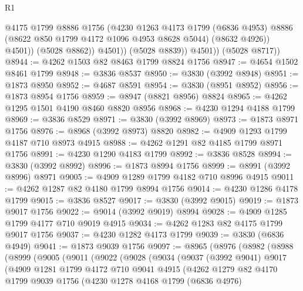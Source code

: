 \begin{lexlean}{R1}
\begin{coremodule}
                      @4175
                      @1799
                      @8886
                      @1756
                      (@4230
                        @1263
                        @4173
                        @1799
                        (@6836 @4953)
                        @8886
                        (@8622 @850 @1799 @4172 @1096 @4953 @8628 @5044)
                        (@8632 @4926))
                      @4501))
                  (@5028 @8862))
                @4501))
            (@5028 @8839))
          @4501))
      (@5028 @8717))
@8944 := @4262 @1503 @82 @8463 @1799 @8824 @1756
@8947 := @4654 @1502 @8461 @1799
@8948 := @3836 @8537
@8950 := @3830 (@3992 @8948)
@8951 := @1873 @8950
@8952 := @4687 @8591
@8954 := @3830 (@8951 @8952)
@8956 := @1873 @8954 @1756
@8959 := @8947 (@8821 @8956) @8824
@8965 := @4262 @1295 @1501 @4190 @8460 @8820 @8956
@8968 := @4230 @1294 @4188 @1799
@8969 := @3836 @8529
@8971 := @3830 (@3992 @8969)
@8973 := @1873 @8971 @1756
@8976 := @8968 (@3992 @8973) @8820
@8982 := @4909 @1293 @1799 @4187 @710 @8973 @4915
@8988 := @4262 @1291 @82 @4185 @1799 @8971 @1756
@8991 := @4230 @1290 @4183 @1799
@8992 := @3836 @8528
@8994 := @3830 (@3992 @8992)
@8996 := @1873 @8994 @1756
@8999 := @8991 (@3992 @8996) @8971
@9005 := @4909 @1289 @1799 @4182 @710 @8996 @4915
@9011 := @4262 @1287 @82 @4180 @1799 @8994 @1756
@9014 := @4230 @1286 @4178 @1799
@9015 := @3836 @8527
@9017 := @3830 (@3992 @9015)
@9019 := @1873 @9017 @1756
@9022 := @9014 (@3992 @9019) @8994
@9028 := @4909 @1285 @1799 @4177 @710 @9019 @4915
@9034 := @4262 @1283 @82 @4175 @1799 @9017 @1756
@9037 := @4230 @1282 @4173 @1799
@9039 := @3830 (@6836 @4949)
@9041 := @1873 @9039 @1756
@9097 := @8965
    (@8976
      (@8982
        (@8988
          (@8999
            (@9005
              (@9011
                (@9022
                  (@9028
                    (@9034
                      (@9037
                        (@3992 @9041)
                        @9017
                        (@4909
                          @1281
                          @1799
                          @4172
                          @710
                          @9041
                          @4915
                          (@4262
                            @1279
                            @82
                            @4170
                            @1799
                            @9039
                            @1756
                            (@4230
                              @1278
                              @4168
                              @1799
                              (@6836 @4976)

\end{coremodule}
\end{lexlean}
